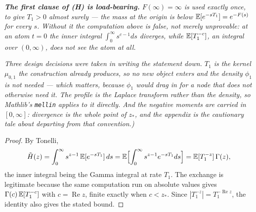 \begin{lemma}
\emph{\textbf{The first clause of (H) is load-bearing.} $F(\infty) = \infty$ is used exactly once,
to give $T_1 > 0$ almost surely --- the mass at the origin is below $\mathbb{E}[e^{-sT_1}] = e^{-F(s)}$ for
every $s$. Without it the computation above is \emph{false}, not merely unprovable: at an atom
$t = 0$ the inner integral $\int_0^\infty s^{c-1}ds$ diverges, while $\mathbb{E}[T_1^{-c}]$, an integral
over $(0,\infty)$, does not see the atom at all.}

\emph{Three design decisions were taken in writing the statement down. $T_1$ is the kernel
$\mu_{0,1}$ the construction already produces, so no new object enters and the density $\phi_1$
is \emph{not} needed --- which matters, because $\phi_1$ would drag in  for a node
that does not otherwise need it. The profile is the Laplace transform rather than the density, so
Mathlib's \texttt{mellin} applies to it directly. And the negative moments are carried in
$[0,\infty]$: divergence is the whole point of $z_*$, and the appendix is the cautionary tale about
departing from that convention.)}
\end{lemma}

\begin{proof}
\leanok
By Tonelli,
\[
  \tilde H(z) = \int_0^\infty s^{z-1}\,\mathbb{E}[e^{-sT_1}]\,ds
  = \mathbb{E}\Bigl[\int_0^\infty s^{z-1}e^{-sT_1}ds\Bigr]
  = \mathbb{E}[T_1^{-z}]\,\Gamma(z),
\]
the inner integral being the Gamma integral at rate $T_1$. The exchange is legitimate because the
same computation run on absolute values gives $\Gamma(c)\,\mathbb{E}[T_1^{-c}]$ with
$c = \operatorname{Re} z$, finite exactly when $c < z_*$. Since
$|T_1^{-z}| = T_1^{-\operatorname{Re} z}$, the identity also gives the stated bound.
\end{proof}

